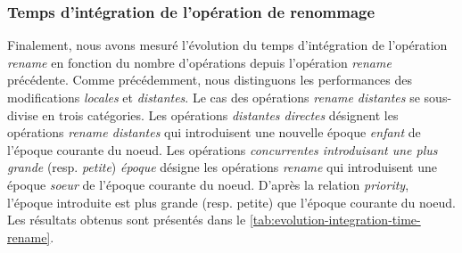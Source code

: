 \documentclass[12pt]{thesul}
\begin{document}
\subsubsection{Temps d'intégration de l'opération de renommage}

Finalement, nous avons mesuré l'évolution du temps d'intégration de l'opération \emph{rename} en fonction du nombre d'opérations depuis l'opération \emph{rename} précédente.
Comme précédemment, nous distinguons les performances des modifications \emph{locales} et \emph{distantes}.
Le cas des opérations \emph{rename distantes} se sous-divise en trois catégories.
Les opérations \emph{distantes directes} désignent les opérations \emph{rename distantes} qui introduisent une nouvelle époque \emph{enfant} de l'époque courante du noeud.
Les opérations \emph{concurrentes introduisant une plus grande} (resp. \emph{petite}) \emph{époque} désigne les opérations \emph{rename} qui introduisent une époque \emph{soeur} de l'époque courante du noeud.
D'après la relation \emph{priority}, l'époque introduite est plus grande (resp. petite) que l'époque courante du noeud.
Les résultats obtenus sont présentés dans le \autoref{tab:evolution-integration-time-rename}.
\end{document}
